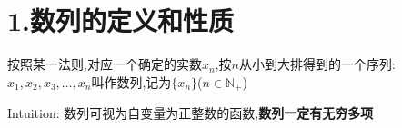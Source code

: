 \documentclass[11pt,a4paper,UTF8]{ctexart}
\begin{document}
\pagestyle{fancy}
\fancyhf{}
\fancyhead[R]{\small\color{TitlePurple}\nouppercase{\leftmark}}
\renewcommand{\headrulewidth}{0.5pt}

\tableofcontents
\newpage
{}



\section{1.数列的定义和性质}

\begin{thmbox}[1.数列的定义]

  按照某一法则,对应一个确定的实数$x_n$,按$n$从小到大排得到的一个序列:$x_1, x_2, x_3, \dots, x_n$叫作数列,记为$\{x_n\}$($n \in \mathbb{N}_+$)

  Intuition: 数列可视为自变量为正整数的函数,\textbf{数列一定有无穷多项}

\end{thmbox}
\end{document}

